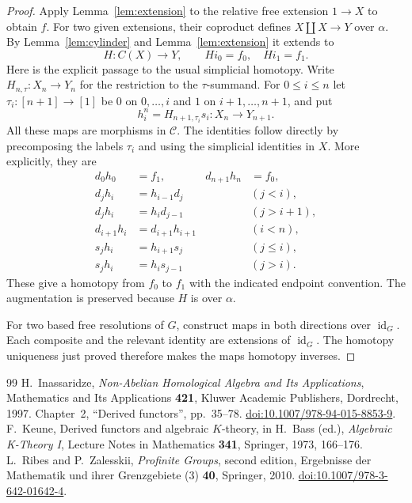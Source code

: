 \documentclass[10pt,a4paper]{amsart}
\newcommand{\C}{\mathcal C}
\newcommand{\id}{\operatorname{id}}
\begin{document}
\begin{proof}
Apply Lemma~\ref{lem:extension} to the relative free extension
$1\to X$ to obtain $f$. For two given extensions, their coproduct
defines $X\amalg X\to Y$ over $\alpha$. By
Lemma~\ref{lem:cylinder} and Lemma~\ref{lem:extension} it extends to
\[
 H:C(X)\longrightarrow Y,\qquad H i_0=f_0,\quad H i_1=f_1.
\]
Here is the explicit passage to the usual simplicial homotopy.
Write $H_{n,\tau}:X_n\to Y_n$ for the restriction to the
$\tau$-summand. For $0\leq i\leq n$ let
$\tau_i:[n+1]\to[1]$ be $0$ on $0,\ldots,i$ and $1$ on
$i+1,\ldots,n+1$, and put
\[
 h_i^n=H_{n+1,\tau_i}s_i:X_n\longrightarrow Y_{n+1}.
\]
All these maps are morphisms in $\C$. The identities follow directly
by precomposing the labels $\tau_i$ and using the simplicial identities
in $X$. More explicitly, they are
\begin{align*}
 d_0h_0&=f_1,&d_{n+1}h_n&=f_0,\\
 d_jh_i&=h_{i-1}d_j &&(j<i),\\
 d_jh_i&=h_i d_{j-1} &&(j>i+1),\\
 d_{i+1}h_i&=d_{i+1}h_{i+1} &&(i<n),\\
 s_jh_i&=h_{i+1}s_j &&(j\leq i),\\
 s_jh_i&=h_i s_{j-1} &&(j>i).
\end{align*}
These give a homotopy from $f_0$ to $f_1$ with the indicated endpoint
convention. The augmentation is preserved because $H$ is over
$\alpha$.

For two based free resolutions of $G$, construct maps in both
directions over $\id_G$. Each composite and the relevant identity
are extensions of $\id_G$. The homotopy uniqueness just proved
therefore makes the maps homotopy inverses.
\end{proof}

\begin{thebibliography}{99}
 H.~Inassaridze, \emph{Non-Abelian Homological Algebra and Its Applications}, Mathematics and Its Applications \textbf{421}, Kluwer Academic Publishers, Dordrecht, 1997. Chapter~2, ``Derived functors'', pp.~35--78. \href{https://doi.org/10.1007/978-94-015-8853-9}{doi:10.1007/978-94-015-8853-9}.
 F.~Keune, Derived functors and algebraic $K$-theory, in H.~Bass (ed.), \emph{Algebraic K-Theory I}, Lecture Notes in Mathematics \textbf{341}, Springer, 1973, 166--176.
 L.~Ribes and P.~Zalesskii, \emph{Profinite Groups}, second edition, Ergebnisse der Mathematik und ihrer Grenzgebiete (3) \textbf{40}, Springer, 2010. \href{https://doi.org/10.1007/978-3-642-01642-4}{doi:10.1007/978-3-642-01642-4}.
\end{thebibliography}
\end{document}
